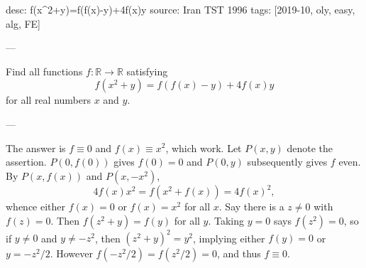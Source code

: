 desc: f(x^2+y)=f(f(x)-y)+4f(x)y
source: Iran TST 1996
tags: [2019-10, oly, easy, alg, FE]

---

Find all functions $f:\mathbb R\to\mathbb R$ satisfying \[f(x^2+y)=f(f(x)-y)+4f(x)y\]
for all real numbers $x$ and $y$.

---

The answer is $f\equiv0$ and $f(x)\equiv x^2$, which work. Let $P(x,y)$ denote the assertion. $P(0,f(0))$ gives $f(0)=0$ and $P(0,y)$ subsequently gives $f$ even. By $P(x,f(x))$ and $P(x,-x^2)$, \[4f(x)x^2=f\left(x^2+f(x)\right)=4f(x)^2,\]
whence either $f(x)=0$ or $f(x)=x^2$ for all $x$. Say there is a $z\ne0$ with $f(z)=0$. Then $f(z^2+y)=f(y)$ for all $y$. Taking $y=0$ says $f(z^2)=0$, so if $y\ne0$ and $y\ne-z^2$, then $(z^2+y)^2=y^2$, implying either $f(y)=0$ or $y=-z^2/2$. However $f(-z^2/2)=f(z^2/2)=0$, and thus $f\equiv0$.
